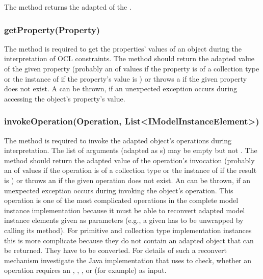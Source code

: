 The method  returns the adapted  of the 
.

\subsubsection{getProperty(Property)}

The method  is required to get the properties'
values of an object during the interpretation of \acs{OCL} constraints. The
method should return the adapted value of the given property (probably an 
 of values if the property is of a collection
type or the instance of  if the property's value is 
) or throws a  if the 
given property does not exist. A  can be thrown, 
if an unexpected exception occurs during accessing the object's property's 
value.

\subsubsection{invokeOperation(Operation, List<IModelInstanceElement>)}
			
The method  is 
required to invoke the adapted object's operations during interpretation. The 
list of arguments (adapted as s) may be empty but
not . The method should return the adapted value of the operation's 
invocation (probably an  of values if the 
operation is of a collection type or the instance of 
if the result is ) or throws an  if the 
given operation does not exist. An  can be
thrown, if an unexpected exception occurs during invoking the object's
operation. This operation is one of the most complicated operations in the 
complete model instance implementation because it must be able to reconvert 
adapted model instance elements given as parameters (e.g., a given 
 has to be unwrapped by calling its 
 method). For primitive and collection type implementation 
instances this is more complicate because they do not contain an adapted object 
that can be returned. They have to be converted. For details of such a reconvert
mechanism investigate the Java implementation that uses  to check, whether an operation requires an , 
, , or  (for example) as input.


